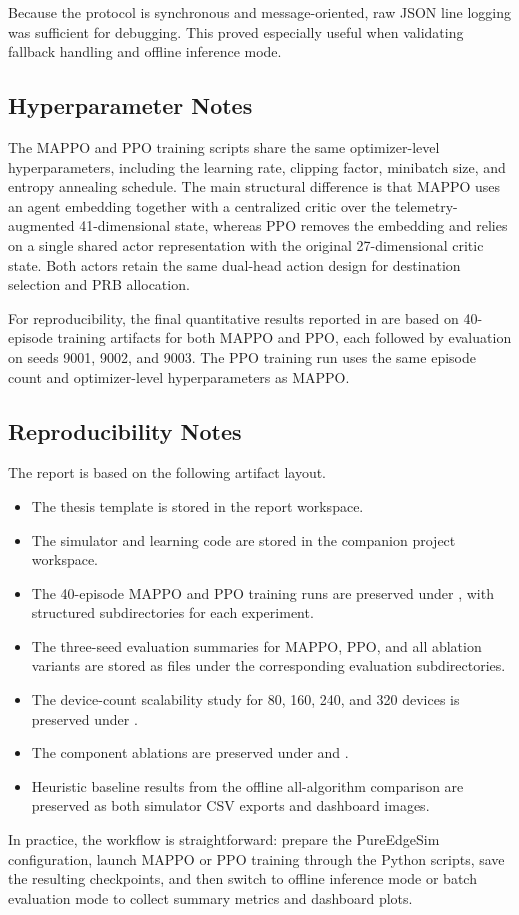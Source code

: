 Because the protocol is synchronous and message-oriented, raw JSON line logging was sufficient for debugging. This proved especially useful when validating fallback handling and offline inference mode.

\subsection{Hyperparameter Notes}
\label{subsec:appendix-hyperparameters}

The MAPPO and PPO training scripts share the same optimizer-level hyperparameters, including the learning rate, clipping factor, minibatch size, and entropy annealing schedule. The main structural difference is that MAPPO uses an agent embedding together with a centralized critic over the telemetry-augmented 41-dimensional state, whereas PPO removes the embedding and relies on a single shared actor representation with the original 27-dimensional critic state. Both actors retain the same dual-head action design for destination selection and PRB allocation.

For reproducibility, the final quantitative results reported in  are based on 40-episode training artifacts for both MAPPO and PPO, each followed by evaluation on seeds 9001, 9002, and 9003. The PPO training run uses the same episode count and optimizer-level hyperparameters as MAPPO.

\subsection{Reproducibility Notes}
\label{subsec:appendix-reproducibility}

The report is based on the following artifact layout.
\begin{itemize}
    \item The thesis template is stored in the report workspace.
    \item The simulator and learning code are stored in the companion project workspace.
    \item The 40-episode MAPPO and PPO training runs are preserved under , with structured subdirectories for each experiment.
    \item The three-seed evaluation summaries for MAPPO, PPO, and all ablation variants are stored as  files under the corresponding evaluation subdirectories.
    \item The device-count scalability study for 80, 160, 240, and 320 devices is preserved under .
    \item The component ablations are preserved under  and .
    \item Heuristic baseline results from the offline all-algorithm comparison are preserved as both simulator CSV exports and dashboard images.
\end{itemize}

In practice, the workflow is straightforward: prepare the PureEdgeSim configuration, launch MAPPO or PPO training through the Python scripts, save the resulting checkpoints, and then switch to offline inference mode or batch evaluation mode to collect summary metrics and dashboard plots.

